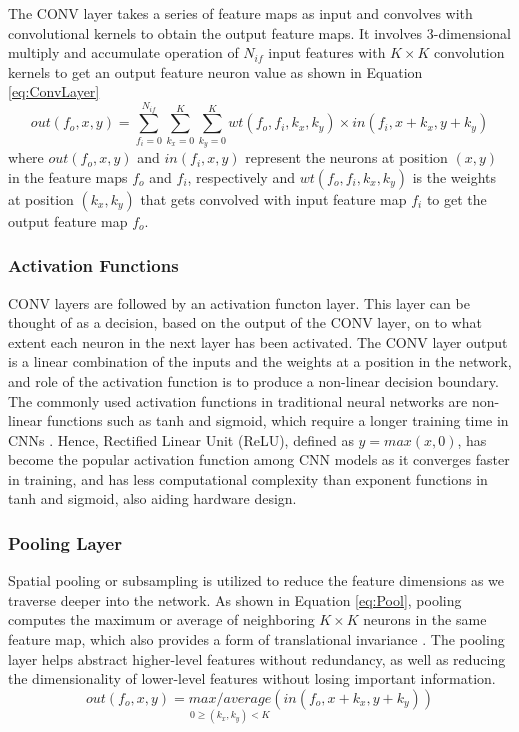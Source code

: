 \documentclass[12pt]{article}
\begin{document}
The CONV layer takes a series of feature maps as input and convolves with convolutional kernels to obtain the output feature maps. It involves 3-dimensional multiply and accumulate operation of $N_{if}$ input features with $K\times K$ convolution kernels to get an output feature neuron value as shown in Equation \ref{eq:ConvLayer}
\begin{equation}
out(f_o,x,y)=\sum^{N_{if}}_{f_i=0} \sum^{K}_{k_x=0} \sum^{K}_{k_y=0} wt(f_o,f_i,k_x,k_y)\times in(f_i,x+k_x,y+k_y)
\label{eq:ConvLayer}
\end{equation}
where $out(f_o,x,y)$ and $in(f_i,x,y)$ represent the neurons at position $(x,y)$ in the feature maps $f_o$ and $f_i$, respectively and $wt(f_o,f_i,k_x,k_y)$ is the weights at position $(k_x,k_y)$ that gets convolved with input feature map $f_i$ to get the output feature map $f_o$\cite{fpgaCnnAccelerator}.

\subsubsection{Activation Functions}
\label{sec:Background-CNN-Activation}
\vspace{-12pt}

CONV layers are followed by an activation functon layer. This layer can be thought of as a decision, based on the output of the CONV layer, on to what extent each neuron in the next layer has been activated. The CONV layer output is a linear combination of the inputs and the weights at a position in the network, and role of the activation function is to produce a non-linear decision boundary. The commonly used activation functions in traditional neural networks are non-linear functions such as tanh and sigmoid, which require a longer training time in CNNs \cite{AlexNet}. Hence, Rectified Linear Unit (ReLU), defined as $y = max(x,0)$, has become the popular activation function among CNN models as it converges faster in training, and has less computational complexity than exponent functions in tanh and sigmoid, also aiding hardware design.

\subsubsection{Pooling Layer}
\label{sec:Background-CNN-Pool}
\vspace{-12pt}

Spatial pooling or subsampling is utilized to reduce the feature dimensions as we traverse deeper into the network. As shown in Equation \ref{eq:Pool}, pooling computes the maximum or average of neighboring $K\times K$ neurons in the same feature map, which also provides a form of translational invariance \cite{PoolAnalysis}. The pooling layer helps abstract higher-level features without redundancy, as well as reducing the dimensionality of lower-level features without losing important information\cite{fpgaCnnAccelerator}.
\begin{equation}
out(f_o,x,y)=\underset{0\geqslant (k_x,k_y)<K}{max/average}(in(f_o,x+k_x,y+k_y))
\label{eq:Pool}
\end{equation}
\end{document}
